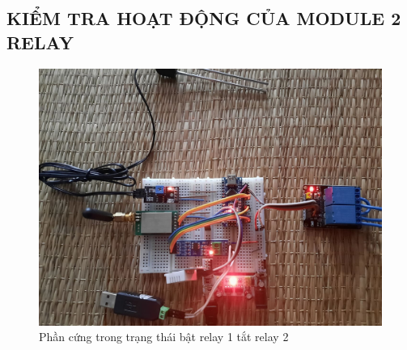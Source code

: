 \subsection{KIỂM TRA HOẠT ĐỘNG CỦA MODULE 2 RELAY}
\begin{figure}[H]
	\centering
	\includegraphics[scale=0.2]{Chapter 4/image chapter 4/R1ONR2OFF.jpg}
	\caption[Phần cứng trong trạng thái bật relay 1 tắt relay 2]{Phần cứng trong trạng thái bật relay 1 tắt relay 2}
	\label{hinh45}
\end{figure}
